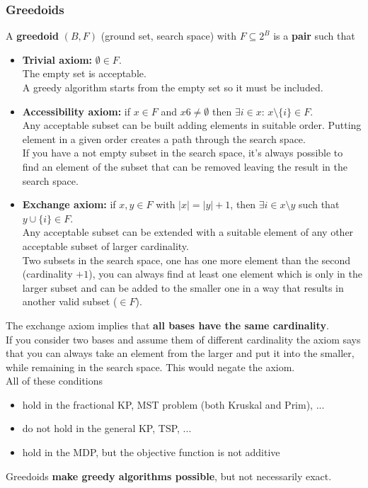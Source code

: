 \subsubsection{Greedoids}
A \textbf{greedoid} $(B, F)$ (ground set, search space) with $F \subseteq 2^B$ is a \textbf{pair} such that
\begin{itemize}
	\item \textbf{Trivial axiom:} $\emptyset \in F$.\\
	The empty set is acceptable. \\
	A greedy algorithm starts from the empty set so it must be included.\\
	
	\item \textbf{Accessibility axiom:} if $x \in F$ and $x 6\neq \emptyset$ then $\exists i \in x : \, x \setminus \{i\} \in F$.\\
	Any acceptable subset can be built adding elements in suitable order. Putting element in a given order creates a path through the search space.\\
	If you have a not empty subset in the search space, it's always possible to find an element of the subset that can be removed leaving the result in the search space.\\
	
	\item \textbf{Exchange axiom:} if $x, y \in F$ with $|x| = |y| + 1$, then $\exists i \in x \setminus y$ such that $y \cup \{i\} \in F$.\\
	Any acceptable subset can be extended with a suitable element of any other acceptable subset of larger cardinality.\\
	Two subsets in the search space, one has one more element than the second (cardinality $+1$), you can always find at least one element which is only in the larger subset and can be added to the smaller one in a way that results in another valid subset ($\in F$).\\
\end{itemize}

The exchange axiom implies that \textbf{all bases have the same cardinality}. \\
If you consider two bases and assume them of different cardinality the axiom says that you can always take an element from the larger and put it into the smaller, while remaining in the search space. This would negate the axiom.\\

All of these conditions
\begin{itemize}
	\item hold in the fractional KP, MST problem (both Kruskal and Prim), ...
	\item do not hold in the general KP, TSP, ...
	\item hold in the MDP, but the objective function is not additive
\end{itemize}
Greedoids \textbf{make greedy algorithms possible}, but not necessarily exact.\\


